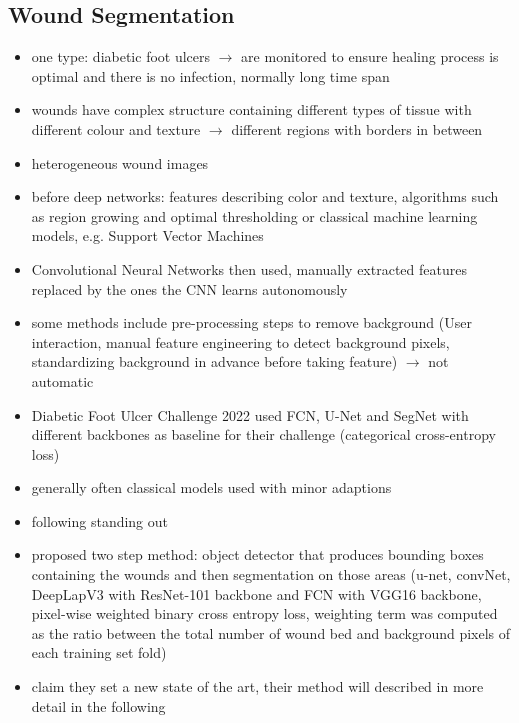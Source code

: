 

\subsection{Wound Segmentation}

\begin{itemize}
	\item one type: diabetic foot ulcers $\rightarrow$ are monitored to ensure healing process is optimal and there is no infection, normally long time span \cite{DFUC2022}
\end{itemize}

\begin{itemize}
	\item wounds have complex structure containing different types of tissue with different colour and texture $\rightarrow$ different regions with borders in between \cite{AhmadFauzi2015}
	\item heterogeneous wound images
\end{itemize}

\begin{itemize}
	\item before deep networks: features describing color and texture, algorithms such as region growing and optimal thresholding or classical machine learning models, e.g. Support Vector Machines \cite{Scebba2022}
	\item Convolutional Neural Networks then used, manually extracted features replaced by the ones the CNN learns autonomously \cite{Scebba2022}
	\item some methods include pre-processing steps to remove background (User interaction, manual feature engineering to detect background pixels, standardizing background in advance before taking feature) $\rightarrow$ not automatic
	\item Diabetic Foot Ulcer Challenge 2022 used FCN, U-Net and SegNet with different backbones as baseline for their challenge (categorical cross-entropy loss) \cite{DFUC2022}
	\item generally often classical models used with minor adaptions
	\item following standing out
	\item \citeauthor{Scebba2022} proposed two step method: object detector that produces bounding boxes containing the wounds and then segmentation on those areas (u-net, convNet, DeepLapV3 with ResNet-101 backbone and FCN with VGG16 backbone, pixel-wise weighted binary cross entropy loss, weighting term was computed as the ratio between the total number of wound bed and background pixels of each training set fold)
	\item \citeauthor{Oota_2023_WACV} claim they set a new state of the art, their method will described in more detail in the following
\end{itemize}


